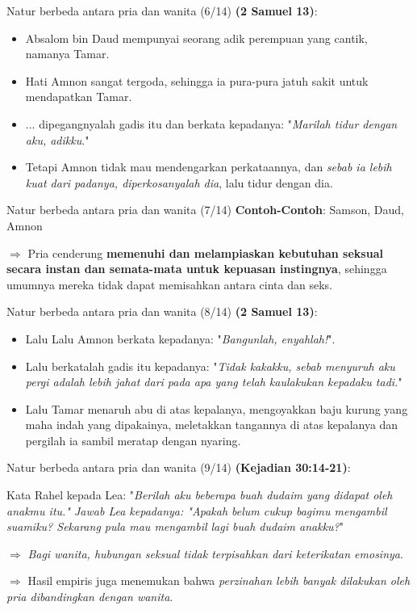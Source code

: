 \documentclass{beamer}
\theoremstyle{mystyle}
\let\emph\relax %
\begin{document}
\begin{frame}{Natur berbeda antara pria dan wanita (6/14)}
	\emph{Amnon} \textbf{(2 Samuel 13)}:  
	\begin{itemize}
		\item<2-> Absalom bin Daud mempunyai seorang adik perempuan yang cantik, namanya Tamar.
		\item<3-> Hati Amnon sangat tergoda, sehingga ia pura-pura jatuh sakit untuk mendapatkan Tamar.
		\item<4-> ... dipegangnyalah gadis itu dan berkata kepadanya: "\textit{Marilah tidur dengan aku, adikku}."
		\item<5-> Tetapi Amnon tidak mau mendengarkan perkataannya, dan \textit{sebab ia lebih kuat dari padanya, diperkosanyalah dia}, lalu tidur dengan dia.
	\end{itemize}		

	
\end{frame}

\begin{frame}{Natur berbeda antara pria dan wanita (7/14)}
		\onslide<2->\textbf{Contoh-Contoh}: Samson, Daud, Amnon 
		
		\bigskip
		 $\Longrightarrow$ Pria cenderung \textbf{memenuhi dan melampiaskan kebutuhan seksual secara instan dan semata-mata untuk kepuasan instingnya}, sehingga umumnya mereka tidak dapat memisahkan antara cinta dan seks.
\end{frame}

\begin{frame}{Natur berbeda antara pria dan wanita (8/14)}
 \emph{Tamar} \textbf{(2 Samuel 13)}: 
\begin{itemize}
	\item<3-> Lalu Lalu Amnon berkata kepadanya: "\textit{Bangunlah, enyahlah!}". 
	\item<4-> Lalu berkatalah gadis itu kepadanya: "\textit{Tidak kakakku, sebab menyuruh aku pergi adalah lebih jahat dari pada apa yang telah kaulakukan kepadaku tadi.}"
	\item<5-> Lalu Tamar menaruh abu di atas kepalanya, mengoyakkan baju kurung yang maha indah yang dipakainya, meletakkan tangannya di atas kepalanya dan pergilah ia sambil meratap dengan nyaring. 
\end{itemize}
\end{frame}


\begin{frame}{Natur berbeda antara pria dan wanita (9/14)}
 \emph{Lea} \textbf{(Kejadian 30:14-21)}: 

\bigskip
{} Kata Rahel kepada Lea: "\textit{Berilah aku beberapa buah dudaim yang didapat oleh anakmu itu." Jawab Lea kepadanya: "Apakah belum cukup bagimu mengambil suamiku? Sekarang pula mau mengambil lagi buah dudaim anakku?}"

\bigskip

	 $\Longrightarrow$ \textit{Bagi wanita, hubungan seksual tidak terpisahkan dari keterikatan emosinya}.
	
	\bigskip
	 $\Longrightarrow$ Hasil empiris juga menemukan bahwa \textit{perzinahan lebih banyak dilakukan oleh pria dibandingkan dengan wanita}. 		
\end{frame}
\end{document}
